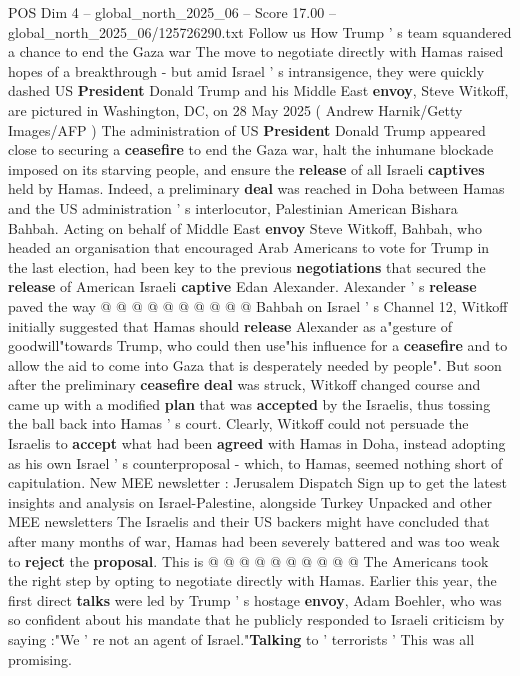 \begin{textsample}{POS Dim 4 – global\_north\_2025\_06 – Score 17.00 – global\_north\_2025\_06/125726290.txt}  \label{ex:f4_pos_386}
Follow us How Trump ' s team squandered a chance to end the Gaza war The move to negotiate directly with Hamas raised hopes of a breakthrough - but amid Israel ' s intransigence, they were quickly dashed US \textbf{President} Donald Trump and his Middle East \textbf{envoy}, Steve Witkoff, are pictured in Washington, DC, on 28 May 2025 ( Andrew Harnik/Getty Images/AFP ) The administration of US \textbf{President} Donald Trump appeared close to securing a \textbf{ceasefire} to end the Gaza war, halt the inhumane blockade imposed on its starving people, and ensure the \textbf{release} of all Israeli \textbf{captives} held by Hamas.
Indeed, a preliminary \textbf{deal} was reached in Doha between Hamas and the US administration ' s interlocutor, Palestinian American Bishara Bahbah.
Acting on behalf of Middle East \textbf{envoy} Steve Witkoff, Bahbah, who headed an organisation that encouraged Arab Americans to vote for Trump in the last election, had been key to the previous \textbf{negotiations} that secured the \textbf{release} of American Israeli \textbf{captive} Edan Alexander.
Alexander ' s \textbf{release} paved the way @ @ @ @ @ @ @ @ @ @ Bahbah on Israel ' s Channel 12, Witkoff initially suggested that Hamas should \textbf{release} Alexander as a"gesture of goodwill"towards Trump, who could then use"his influence for a \textbf{ceasefire} and to allow the aid to come into Gaza that is desperately needed by people".
But soon after the preliminary \textbf{ceasefire} \textbf{deal} was struck, Witkoff changed course and came up with a modified \textbf{plan} that was \textbf{accepted} by the Israelis, thus tossing the ball back into Hamas ' s court.
Clearly, Witkoff could not persuade the Israelis to \textbf{accept} what had been \textbf{agreed} with Hamas in Doha, instead adopting as his own Israel ' s counterproposal - which, to Hamas, seemed nothing short of capitulation.
New MEE newsletter : Jerusalem Dispatch Sign up to get the latest insights and analysis on Israel-Palestine, alongside Turkey Unpacked and other MEE newsletters The Israelis and their US backers might have concluded that after many months of war, Hamas had been severely battered and was too weak to \textbf{reject} the \textbf{proposal}.
This is @ @ @ @ @ @ @ @ @ @ The Americans took the right step by opting to negotiate directly with Hamas.
Earlier this year, the first direct \textbf{talks} were led by Trump ' s hostage \textbf{envoy}, Adam Boehler, who was so confident about his mandate that he publicly responded to Israeli criticism by saying :"We ' re not an agent of Israel."\textbf{Talking} to ' terrorists ' This was all promising.

\end{textsample}

